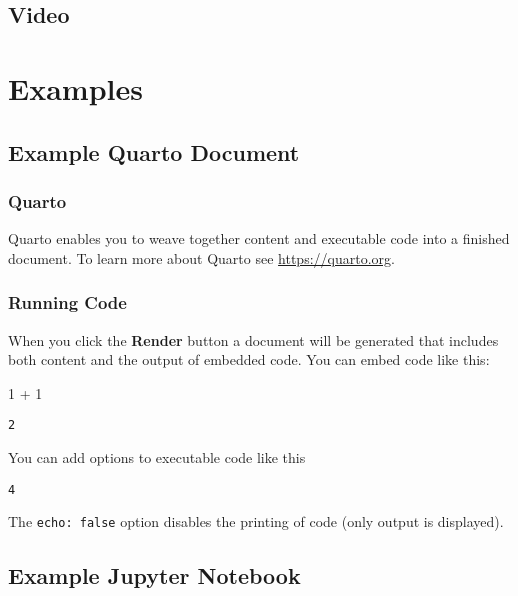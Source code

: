 \documentclass[
  letterpaper,
  DIV=11,
  numbers=noendperiod]{scrreprt}
\newenvironment{Shaded}{\begin{snugshade}}{\end{snugshade}}
\newcommand{\DecValTok}[1]{\textcolor[rgb]{0.68,0.00,0.00}{#1}}
\newcommand{\OperatorTok}[1]{\textcolor[rgb]{0.37,0.37,0.37}{#1}}
\begin{document}
\hypertarget{video-2}{%
\chapter{Video}\label{video-2}}

\part{Examples}

\hypertarget{example-quarto-document}{%
\chapter{Example Quarto Document}\label{example-quarto-document}}

\hypertarget{quarto}{%
\section{Quarto}\label{quarto}}

Quarto enables you to weave together content and executable code into a
finished document. To learn more about Quarto see
\url{https://quarto.org}.

\hypertarget{running-code}{%
\section{Running Code}\label{running-code}}

When you click the \textbf{Render} button a document will be generated
that includes both content and the output of embedded code. You can
embed code like this:

\begin{Shaded}
\begin{Highlighting}[]
\DecValTok{1} \OperatorTok{+} \DecValTok{1}
\end{Highlighting}
\end{Shaded}

\begin{verbatim}
2
\end{verbatim}

You can add options to executable code like this

\begin{verbatim}
4
\end{verbatim}

The \texttt{echo:\ false} option disables the printing of code (only
output is displayed).

\hypertarget{example-jupyter-notebook}{%
\chapter{Example Jupyter Notebook}\label{example-jupyter-notebook}}
\end{document}
